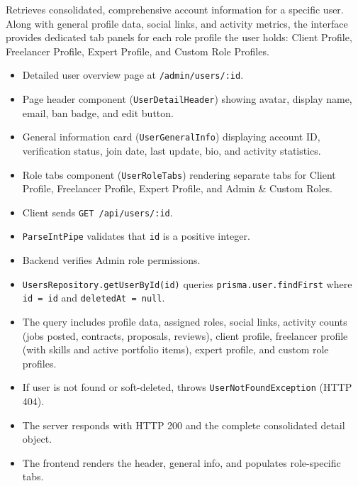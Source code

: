 \noindent Retrieves consolidated, comprehensive account information for a specific user. Along with general profile data, social links, and activity metrics, the interface provides dedicated tab panels for each role profile the user holds: Client Profile, Freelancer Profile, Expert Profile, and Custom Role Profiles.

\begin{itemize}[leftmargin=1.6em,topsep=3pt,itemsep=2pt,parsep=0pt,label=$\bullet$]
    \item Detailed user overview page at \texttt{/admin/users/:id}.
    \item Page header component (\texttt{UserDetailHeader}) showing avatar, display name, email, ban badge, and edit button.
    \item General information card (\texttt{UserGeneralInfo}) displaying account ID, verification status, join date, last update, bio, and activity statistics.
    \item Role tabs component (\texttt{UserRoleTabs}) rendering separate tabs for Client Profile, Freelancer Profile, Expert Profile, and Admin \& Custom Roles.
\end{itemize}

\begin{itemize}[leftmargin=1.6em,topsep=3pt,itemsep=2pt,parsep=0pt,label=$\bullet$]
    \item Client sends \texttt{GET /api/users/:id}.
    \item \texttt{ParseIntPipe} validates that \texttt{id} is a positive integer.
    \item Backend verifies Admin role permissions.
    \item \texttt{UsersRepository.getUserById(id)} queries \texttt{prisma.user.findFirst} where \texttt{id = id} and \texttt{deletedAt = null}.
    \item The query includes profile data, assigned roles, social links, activity counts (jobs posted, contracts, proposals, reviews), client profile, freelancer profile (with skills and active portfolio items), expert profile, and custom role profiles.
    \item If user is not found or soft-deleted, throws \texttt{UserNotFoundException} (HTTP 404).
    \item The server responds with HTTP 200 and the complete consolidated detail object.
    \item The frontend renders the header, general info, and populates role-specific tabs.
\end{itemize}


